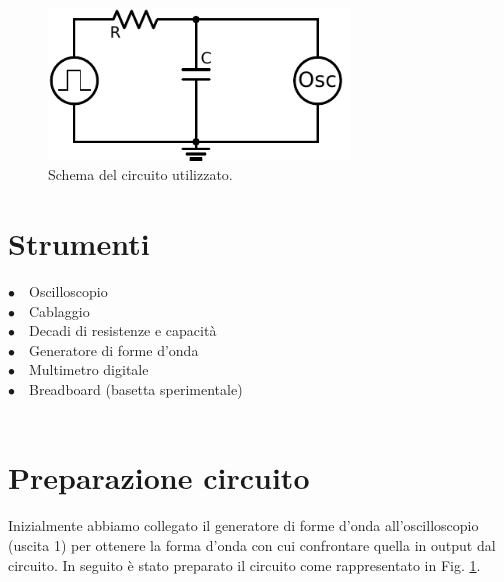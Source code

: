 \begin{figure}
	\centering
    \includegraphics[width=80mm]{schema.pdf}
    \caption{Schema del circuito utilizzato.}
    \label{fig:circuito}
\end{figure}


\section{Strumenti}


$\bullet \quad$Oscilloscopio \\
$\bullet \quad$Cablaggio\\
$\bullet \quad$Decadi di resistenze e capacità\\
$\bullet \quad$Generatore di forme d'onda\\
$\bullet \quad$Multimetro digitale\\
$\bullet \quad$Breadboard (basetta sperimentale)\\
\hspace{2pt}\\

\section{Preparazione circuito}

Inizialmente abbiamo collegato il generatore di forme d'onda all'oscilloscopio (uscita 1) per ottenere la forma d'onda con cui confrontare quella in output dal circuito.
In seguito è stato preparato il circuito come rappresentato in Fig. \ref{fig:circuito}.

